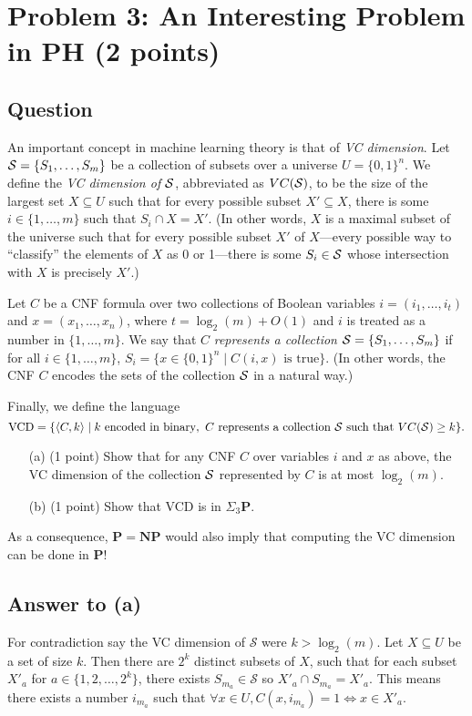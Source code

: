 \documentclass{article}
\renewcommand{\P}{\mathbf{P}}
\newcommand{\NP}{\mathbf{NP}}
\begin{document}
\section*{Problem 3: An Interesting Problem in PH (2 points)}

\subsection*{Question}
An important concept in machine learning theory is that of \emph{VC dimension}.
Let ${\cal S} = \{S_1,\ldots,S_m\}$ be a collection of subsets over a universe $U = \{0,1\}^n$. We define the \emph{VC dimension of $\cal S$}, abbreviated as $VC({\cal S})$, to be the size of the largest set $X \subseteq U$ such that for every possible subset $X' \subseteq X$, there is some $i \in \{1,\ldots,m\}$ such that $S_i \cap X = X'$. (In other words, $X$ is a maximal subset of the universe such that for every possible subset $X'$ of $X$---every possible way to ``classify'' the elements of $X$ as 0 or 1---there is some $S_i \in {\cal S}$ whose intersection with $X$ is precisely $X'$.) 

Let $C$ be a CNF formula over two collections of Boolean variables $i = (i_1,\ldots,i_t)$ and $x = (x_1,\ldots,x_n)$, where $t = \log_2(m)+O(1)$ and $i$ is treated as a number in $\{1,\ldots,m\}$. We say that $C$ \emph{represents a collection ${\cal S} = \{S_1,\ldots,S_m\}$} if for all $i\in\{1,\ldots,m\}$, $S_i = \{x \in \{0,1\}^n \mid C(i,x)\text{ is true}\}$. (In other words, the CNF $C$ encodes the sets of the collection ${\cal S}$ in a natural way.)

Finally, we define the language
\[\text{VCD} = \{ \langle C,k\rangle \mid k \text{ encoded in binary},~ C \text{ represents a collection $\cal S$ such that $VC({\cal S})\geq k$} \}.\]

\begin{enumerate}
\item[(a)] (1 point) Show that for any CNF $C$ over variables $i$ and $x$ as above, the VC dimension of the collection $\cal S$ represented by $C$ is at most $\log_2(m)$.

\item[(b)] (1 point) Show that VCD is in $\Sigma_3 \P$.
\end{enumerate}

\noindent As a consequence, $\P = \NP$ would also imply that computing the VC dimension can be done in $\P$!

\subsection*{Answer to (a)}
For contradiction say the VC dimension of $\mathcal{S}$ were $k > \log_2(m)$.  Let $X \subseteq U$ be a set of size $k$.  Then there are $2^k$ distinct subsets of $X$, such that for each subset $X'_a$ for $a \in \{1, 2, \dots, 2^k\}$, there exists $S_{m_a} \in \mathcal{S}$ so $X'_a \cap S_{m_a} = X'_a$.  This means there exists a number $i_{m_a}$ such that $\forall x \in U, C(x, i_{m_a}) = 1 \iff x \in X'_a$.
\end{document}
